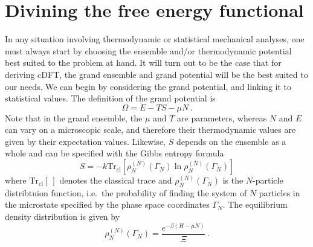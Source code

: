 \documentclass{report}
\newcommand{\trace}{\operatorname{Tr_{cl}}}
\begin{document}
\section{Divining the free energy functional}
In any situation involving thermodynamic or statistical mechanical analyses, one must always start by choosing the ensemble and/or thermodynamic potential best suited to the problem at hand. It will turn out to be the case that for deriving cDFT, the grand ensemble and grand potential will be the best suited to our needs. We can begin by considering the grand potential, and linking it to statistical values. The definition of the grand potential is
\begin{equation}
    \Omega = E - TS - \mu N \,.
    \label{eq:grand_potential}
\end{equation}
Note that in the grand ensemble, the \(\mu\) and \(T\) are parameters, whereas \(N\) and \(E\) can vary on a microscopic scale, and therefore their thermodynamic values are given by their expectation values. Likewise, \(S\) depends on the ensemble as a whole and can be specified with the Gibbs entropy formula
\begin{equation}
    S = -k \trace\left[\rho_N^{(N)}(\Gamma_N)\ln\rho_N^{(N)}(\Gamma_N)\right]
    \label{eq:GibbsEntropy}
\end{equation}
where \(\trace[~]\) denotes the classical trace and \(\rho_N^{(N)}(\Gamma_N)\) is the \(N\)-particle distribtuion function, i.e.\ the probability of finding the system of \(N\) particles in the microstate specified by the phase space coordinates \(\Gamma_N\). The equilibrium density distribution is given by
\begin{equation}
    \rho_N^{(N)}(\Gamma_N) = \frac{e^{-\beta(H-\mu N)}}{\Xi} \, .
    \label{eq:rho}
\end{equation}
\end{document}
